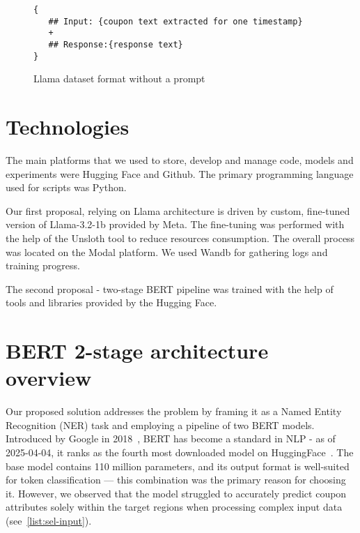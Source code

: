 \documentclass[licencjacka,en]{pracamgr}
\begin{document}
\begin{figure}[h]
\centering
\begin{tcolorbox}[sharp corners, boxrule=0.5mm, colframe=black, colback=white, coltitle=black, width=0.9\textwidth]
\begin{BVerbatim}
{
   ## Input: {coupon text extracted for one timestamp}
   +
   ## Response:{response text}
}
\end{BVerbatim}
\end{tcolorbox}
\caption{Llama dataset format without a prompt}
\label{fig:llama_ds_wth}
\end{figure}

\chapter{Technologies}
The main platforms that we used to store, develop and manage code, models and experiments were Hugging Face\cite{hugging-face} and Github\cite{github}. The primary programming language used for scripts was Python\cite{python}.

Our first proposal, relying on Llama architecture is driven by custom, fine-tuned version of Llama-3.2-1b provided by Meta\cite{meta-llama}. The fine-tuning was performed with the help of the Unsloth\cite{unsloth} tool to reduce resources consumption. The overall process was located on the Modal\cite{modal} platform. We used Wandb\cite{wandb} for gathering logs and training progress.

The second proposal - two-stage BERT pipeline was trained with the help of tools and libraries provided by the Hugging Face.


\chapter{BERT 2-stage architecture overview}
Our proposed solution addresses the problem by framing it as a Named Entity Recognition (NER) task and employing a pipeline of two BERT models. Introduced by Google in 2018~\cite{BERT_intro}, BERT has become a standard in NLP - as of 2025-04-04, it ranks as the fourth most downloaded model on HuggingFace~\cite{BERT_hf}. The base model contains 110 million parameters, and its output format is well-suited for token classification — this combination was the primary reason for choosing it. However, we observed that the model struggled to accurately predict coupon attributes solely within the target regions when processing complex input data (see~\ref{list:sel-input}).
\end{document}
